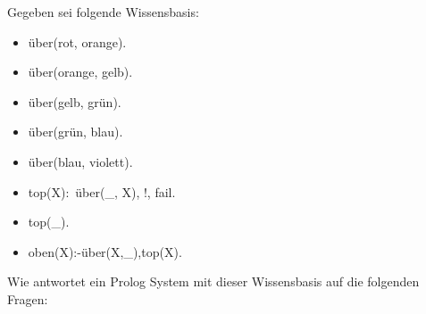 \documentclass[10pt, a4paper]{exam}
\begin{document}
\begin{questions}
  \question Gegeben sei folgende Wissensbasis:\begin{itemize}
    \item über(rot, orange).
    \item über(orange, gelb).
    \item über(gelb, grün).
    \item über(grün, blau).
    \item über(blau, violett).
    \item top(X):~über(\_, X), !, fail.
    \item top(\_).
    \item oben(X):-über(X,\_),top(X).
  \end{itemize} Wie antwortet ein Prolog System mit dieser Wissensbasis auf die folgenden Fragen:


\end{questions}
\end{document}
